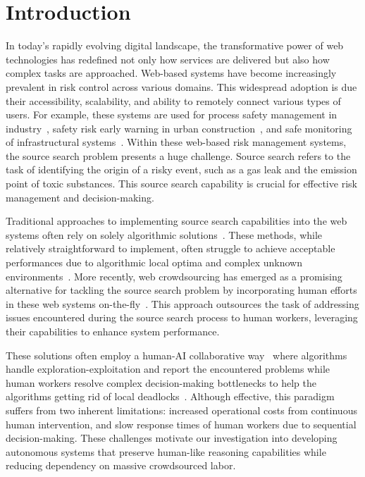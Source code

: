 \section{Introduction}

In today’s rapidly evolving digital landscape, the transformative power of web technologies has redefined not only how services are delivered but also how complex tasks are approached. Web-based systems have become increasingly prevalent in risk control across various domains. This widespread adoption is due their accessibility, scalability, and ability to remotely connect various types of users. For example, these systems are used for process safety management in industry~\cite{kannan2016web}, safety risk early warning in urban construction~\cite{ding2013development}, and safe monitoring of infrastructural systems~\cite{repetto2018web}. Within these web-based risk management systems, the source search problem presents a huge challenge. Source search refers to the task of identifying the origin of a risky event, such as a gas leak and the emission point of toxic substances. This source search capability is crucial for effective risk management and decision-making.

Traditional approaches to implementing source search capabilities into the web systems often rely on solely algorithmic solutions~\cite{ristic2016study}. These methods, while relatively straightforward to implement, often struggle to achieve acceptable performances due to algorithmic local optima and complex unknown environments~\cite{zhao2020searching}. More recently, web crowdsourcing has emerged as a promising alternative for tackling the source search problem by incorporating human efforts in these web systems on-the-fly~\cite{zhao2024user}. This approach outsources the task of addressing issues encountered during the source search process to human workers, leveraging their capabilities to enhance system performance.

These solutions often employ a human-AI collaborative way~\cite{zhao2023leveraging} where algorithms handle exploration-exploitation and report the encountered problems while human workers resolve complex decision-making bottlenecks to help the algorithms getting rid of local deadlocks~\cite{zhao2022crowd}. Although effective, this paradigm suffers from two inherent limitations: increased operational costs from continuous human intervention, and slow response times of human workers due to sequential decision-making. These challenges motivate our investigation into developing autonomous systems that preserve human-like reasoning capabilities while reducing dependency on massive crowdsourced labor.

